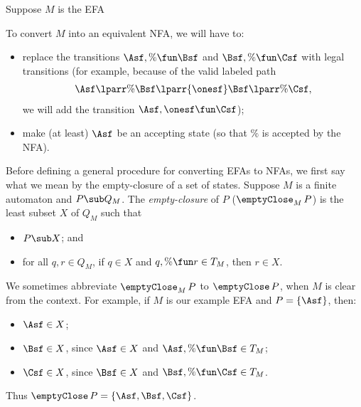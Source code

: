 Suppose $M$ is the EFA
\begin{center}

\end{center}
To convert $M$ into an equivalent NFA, we will have to:
\begin{itemize}
\item replace the transitions $\Asf,\%\fun\Bsf$ and $\Bsf,\%\fun\Csf$
  with legal transitions (for example, because of the valid labeled
  path
  \begin{gather*}
    \Asf\lparr{\%}\Bsf\lparr{\onesf}\Bsf\lparr{\%}\Csf,
  \end{gather*}
  we will add the transition $\Asf,\onesf\fun\Csf$);

\item make (at least) $\Asf$ be an accepting state (so that $\%$ is
  accepted by the NFA).
\end{itemize}

Before defining a general procedure for converting EFAs to NFAs, we
first say what we mean by the empty-closure of a set of states.
Suppose $M$ is a finite automaton and $P\sub Q_M$.  The
\emph{empty-closure} of $P$ ($\emptyClose_M\,P$) is the least subset
$X$ of $Q_M$ such that
\begin{itemize}
\item $P\sub X$; and

\item for all $q,r\in Q_M$, if $q\in X$ and $q,\%\fun r\in T_M$, then
$r\in X$.
\end{itemize}
We sometimes abbreviate $\emptyClose_M\,P$ to $\emptyClose\,P$, when
$M$ is clear from the context.
For example, if $M$ is our example EFA and $P=\{\Asf\}$, then:
\begin{itemize}
\item $\Asf\in X$;

\item $\Bsf\in X$, since $\Asf\in X$ and $\Asf,\%\fun\Bsf\in T_M$;

\item $\Csf\in X$, since $\Bsf\in X$ and $\Bsf,\%\fun\Csf\in T_M$.
\end{itemize}
Thus $\emptyClose\,P=\{\Asf,\Bsf,\Csf\}$.

